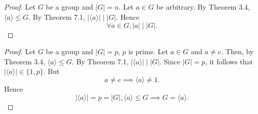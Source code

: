 \documentclass{article}
\newtheorem{corollary}{Corollary}[theorem]
\theoremstyle{definition}
\newtheorem{definition}{Definition}[section]
\begin{document}
     \noindent{}
     \\ \\
     \\ \\
     
     \begin{proof}
        Let $G$ be a group and $|G|=n$. Let $a \in G$ be arbitrary. By Theorem 3.4, $\langle a \rangle \leq G$. By Theorem 7.1, $|\langle a \rangle| \mid |G|$. Hence
        \begin{equation*}
            \forall a \in G, |a| \mid |G|.
        \end{equation*}
     \end{proof}
     
     \noindent{}
     
     \begin{proof}
        Let $G$ be a group and $|G| = p$, $p$ is prime. Let $a \in G$ and $a \neq e$. Then, by Theorem 3.4, $\langle a \rangle \leq G$. By Theorem 7.1, $|\langle a \rangle| \mid |G|$. Since $|G|=p$, it follows that $|\langle a \rangle| \in \{1,p\}$. But 
        \begin{equation*}
            a \neq e \implies \langle a \rangle \neq 1.
        \end{equation*}
        Hence 
        \begin{equation*}
            |\langle a \rangle| = p = |G|, \langle a \rangle \leq G \implies G = \langle a \rangle.
        \end{equation*}
     \end{proof}
     
\end{document}
